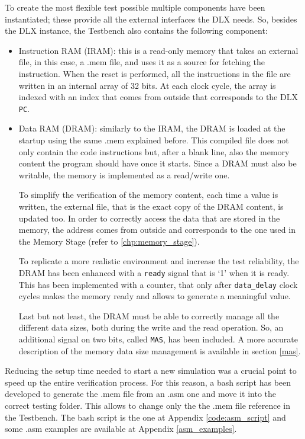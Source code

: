 To create the most flexible test possible multiple components have been instantiated; these provide all the external interfaces the DLX needs. So, besides the DLX instance, the Testbench also contains the following component:
\begin{itemize} 
    \item Instruction RAM (IRAM): this is a read-only memory that takes an external file, in this case, a .mem file, and uses it as a source for fetching the instruction. When the reset is performed, all the instructions in the file are written in an internal array of 32 bits. At each clock cycle, the array is indexed with an index that comes from outside that corresponds to the DLX \texttt{PC}.
    \item Data RAM (DRAM): similarly to the IRAM, the DRAM is loaded at the startup using the same .mem explained before. This compiled file does not only contain the code instructions but, after a blank line, also the memory content the program should have once it starts. Since a DRAM must also be writable, the memory is implemented as a read/write one. 
    
    To simplify the verification of the memory content, each time a value is written, the external file, that is the exact copy of the DRAM content, is updated too.
    In order to correctly access the data that are stored in the memory, the address comes from outside and corresponds to the one used in the Memory Stage (refer to \ref{chp:memory_stage}).
    
    To replicate a more realistic environment and increase the test reliability, the DRAM has been enhanced with a \texttt{ready} signal that is `1' when it is ready. This has been implemented with a counter, that only after \texttt{data\_delay} clock cycles makes the memory ready and allows to generate a meaningful value.
    
    Last but not least, the DRAM must be able to correctly manage all the different data sizes, both during the write and the read operation. So, an additional signal on two bits, called \texttt{MAS}, has been included. A more accurate description of the memory data size management is available in section \ref{mas}.
\end{itemize}

Reducing the setup time needed to start a new simulation was a crucial point to speed up the entire verification process. For this reason, a bash script has been developed to generate the .mem file from an .asm one and move it into the correct testing folder. This allows to change only the the .mem file reference in the Testbench. The bash script is the one at Appendix \ref{code:asm_script} and some .asm examples are available at Appendix \ref{asm_examples}.  

